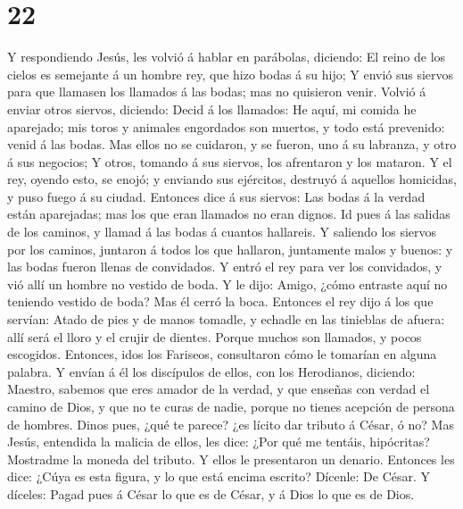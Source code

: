 \hypertarget{section-21}{%
\section{22}\label{section-21}}

 Y respondiendo Jesús, les volvió á hablar en parábolas,
diciendo:  El reino de los cielos es semejante á un hombre
rey, que hizo bodas á su hijo;  Y envió sus siervos para que
llamasen los llamados á las bodas; mas no quisieron venir. 
Volvió á enviar otros siervos, diciendo: Decid á los llamados: He aquí,
mi comida he aparejado; mis toros y animales engordados son muertos, y
todo está prevenido: venid á las bodas.  Mas ellos no se
cuidaron, y se fueron, uno á su labranza, y otro á sus negocios;
 Y otros, tomando á sus siervos, los afrentaron y los
mataron.  Y el rey, oyendo esto, se enojó; y enviando sus
ejércitos, destruyó á aquellos homicidas, y puso fuego á su ciudad.
 Entonces dice á sus siervos: Las bodas á la verdad están
aparejadas; mas los que eran llamados no eran dignos.  Id
pues á las salidas de los caminos, y llamad á las bodas á cuantos
hallareis.  Y saliendo los siervos por los caminos,
juntaron á todos los que hallaron, juntamente malos y buenos: y las
bodas fueron llenas de convidados.  Y entró el rey para ver
los convidados, y vió allí un hombre no vestido de boda.  Y
le dijo: Amigo, ¿cómo entraste aquí no teniendo vestido de boda? Mas él
cerró la boca.  Entonces el rey dijo á los que servían:
Atado de pies y de manos tomadle, y echadle en las tinieblas de afuera:
allí será el lloro y el crujir de dientes.  Porque muchos
son llamados, y pocos escogidos.  Entonces, idos los
Fariseos, consultaron cómo le tomarían en alguna palabra. 
Y envían á él los discípulos de ellos, con los Herodianos, diciendo:
Maestro, sabemos que eres amador de la verdad, y que enseñas con verdad
el camino de Dios, y que no te curas de nadie, porque no tienes acepción
de persona de hombres.  Dinos pues, ¿qué te parece? ¿es
lícito dar tributo á César, ó no?  Mas Jesús, entendida la
malicia de ellos, les dice: ¿Por qué me tentáis, hipócritas?
 Mostradme la moneda del tributo. Y ellos le presentaron un
denario.  Entonces les dice: ¿Cúya es esta figura, y lo que
está encima escrito?  Dícenle: De César. Y díceles: Pagad
pues á César lo que es de César, y á Dios lo que es de Dios.
